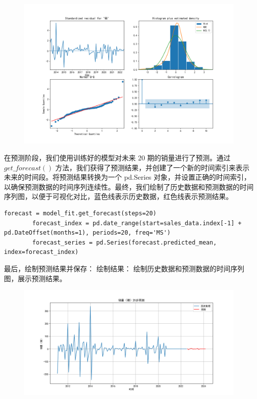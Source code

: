 \documentclass[a4paper]{article}
\begin{document}
	\begin{figure}[H]
		\centering
		\includegraphics[width=1.0\textwidth]{img/A1_1.png}
	\end{figure}

	在预测阶段，我们使用训练好的模型对未来 20 期的销量进行了预测。通过 $get\_forecast()$ 方法，我们获得了预测结果，并创建了一个新的时间索引来表示未来的时间段。将预测结果转换为一个 pd.Series 对象，并设置正确的时间索引，以确保预测数据的时间序列连续性。最终，我们绘制了历史数据和预测数据的时间序列图，以便于可视化对比，蓝色线表示历史数据，红色线表示预测结果。
	\begin{lstlisting}[caption={Python Example}, label={lst:example}]
		forecast = model_fit.get_forecast(steps=20)
		forecast_index = pd.date_range(start=sales_data.index[-1] + pd.DateOffset(months=1), periods=20, freq='MS')
		forecast_series = pd.Series(forecast.predicted_mean, index=forecast_index)
	\end{lstlisting}

	最后，绘制预测结果并保存：
	绘制结果：
	绘制历史数据和预测数据的时间序列图，展示预测结果。
	\begin{figure}[H]
		\centering
		\includegraphics[width=1.0\textwidth]{img/A1_2.png}
	\end{figure}
\end{document}
